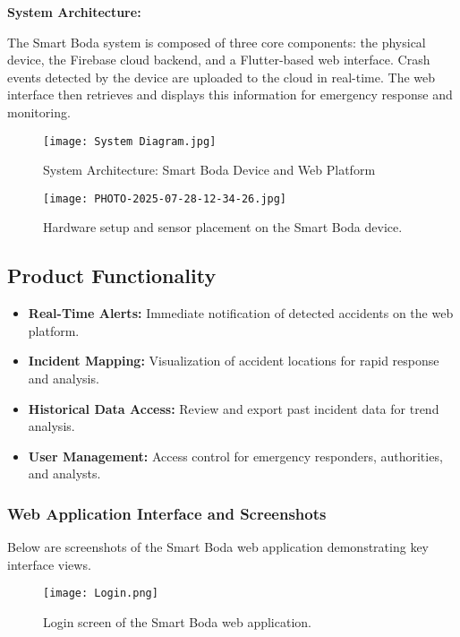 \documentclass[12pt]{article}
\begin{document}
\textbf{System Architecture:}

The Smart Boda system is composed of three core components: the physical device, the Firebase cloud backend, and a Flutter-based web interface. Crash events detected by the device are uploaded to the cloud in real-time. The web interface then retrieves and displays this information for emergency response and monitoring.

\begin{figure}[H]
  \centering
  \texttt{[image: System Diagram.jpg]}
  \caption{System Architecture: Smart Boda Device and Web Platform}
  \label{fig:architecture}
\end{figure}

\begin{figure}[H]
  \centering
  \texttt{[image: PHOTO-2025-07-28-12-34-26.jpg]}
  \caption{Hardware setup and sensor placement on the Smart Boda device.}
  \label{fig:new_image}
\end{figure}

\subsection{Product Functionality}
\begin{itemize}
  \item \textbf{Real-Time Alerts:} Immediate notification of detected accidents on the web platform.
  \item \textbf{Incident Mapping:} Visualization of accident locations for rapid response and analysis.
  \item \textbf{Historical Data Access:} Review and export past incident data for trend analysis.
  \item \textbf{User Management:} Access control for emergency responders, authorities, and analysts.
\end{itemize}

\subsubsection{Web Application Interface and Screenshots}

Below are screenshots of the Smart Boda web application demonstrating key interface views.

\begin{figure}[H]
  \centering
  \texttt{[image: Login.png]}
  \caption{Login screen of the Smart Boda web application.}
  \label{fig:login}
\end{figure}
\end{document}
